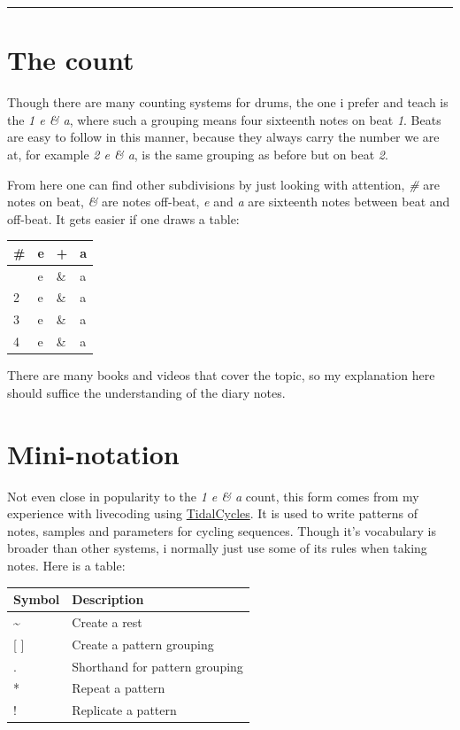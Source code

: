 \documentclass[
]{book}
\begin{document}
\begin{center}\rule{0.5\linewidth}{0.5pt}\end{center}

\section*{The count}\label{the-count}

Though there are many counting systems for drums, the one i prefer and teach is the \emph{1 e \& a}, where such a grouping means four sixteenth notes on beat \emph{1}. Beats are easy to follow in this manner, because they always carry the number we are at, for example \emph{2 e \& a}, is the same grouping as before but on beat \emph{2}.

From here one can find other subdivisions by just looking with attention, \emph{\#} are notes on beat, \emph{\&} are notes off-beat, \emph{e} and \emph{a} are sixteenth notes between beat and off-beat. It gets easier if one draws a table:

\begin{longtable}[]{@{}llll@{}}
\toprule\noalign{}
\# & e & + & a \\
\midrule\noalign{}
\endhead
\bottomrule\noalign{}
\endlastfoot
1 & e & \& & a \\
2 & e & \& & a \\
3 & e & \& & a \\
4 & e & \& & a \\
\end{longtable}

There are many books and videos that cover the topic, so my explanation here should suffice the understanding of the diary notes.

\section*{Mini-notation}\label{mini-notation}

Not even close in popularity to the \emph{1 e \& a} count, this form comes from my experience with livecoding using \href{https://tidalcycles.org/}{TidalCycles}. It is used to write patterns of notes, samples and parameters for cycling sequences. Though it's vocabulary is broader than other systems, i normally just use some of its rules when taking notes. Here is a table:

\begin{longtable}[]{@{}ll@{}}
\toprule\noalign{}
Symbol & Description \\
\midrule\noalign{}
\endhead
\bottomrule\noalign{}
\endlastfoot
\textasciitilde{} & Create a rest \\
{[} {]} & Create a pattern grouping \\
. & Shorthand for pattern grouping \\
* & Repeat a pattern \\
! & Replicate a pattern \\
\end{longtable}
\end{document}
